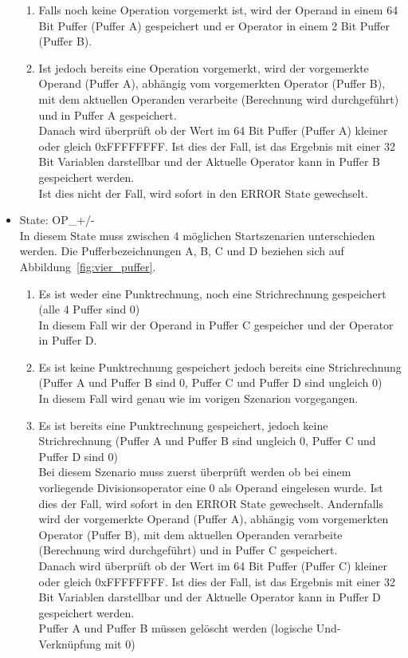 \begin{itemize}
\begin{enumerate}

\item Falls noch keine Operation vorgemerkt ist, wird der Operand in einem 64 Bit Puffer (Puffer A) gespeichert und er Operator in einem 2 Bit Puffer (Puffer B). \\

\item Ist jedoch bereits eine Operation vorgemerkt, wird der vorgemerkte Operand (Puffer A), abhängig vom vorgemerkten Operator (Puffer B), mit dem aktuellen Operanden verarbeite (Berechnung wird durchgeführt) und in Puffer A gespeichert. \\
Danach wird überprüft ob der Wert im 64 Bit Puffer (Puffer A) kleiner oder gleich 0xFFFFFFFF. Ist dies der Fall, ist das Ergebnis mit einer 32 Bit Variablen darstellbar und der Aktuelle Operator kann in Puffer B gespeichert werden. \\
Ist dies nicht der Fall, wird sofort in den ERROR State gewechselt. 

\end{enumerate}

\item State: OP\_+/- \\
In diesem State muss zwischen 4 möglichen Startszenarien unterschieden werden.
Die Pufferbezeichnungen A, B, C und D beziehen sich auf Abbildung~\ref{fig:vier_puffer}.

\begin{enumerate}

\item Es ist weder eine Punktrechnung, noch eine Strichrechnung gespeichert (alle 4 Puffer sind 0)\\
In diesem Fall wir der Operand in Puffer C gespeicher und der Operator in Puffer D.

\item Es ist keine Punktrechnung gespeichert jedoch bereits eine Strichrechnung (Puffer A und Puffer B sind 0, Puffer C und Puffer D sind ungleich 0) \\
In diesem Fall wird genau wie im vorigen Szenarion vorgegangen.

\item Es ist bereits eine Punktrechnung gespeichert, jedoch keine Strichrechnung (Puffer A und Puffer B sind ungleich 0, Puffer C und Puffer D sind 0)\\
Bei diesem Szenario muss zuerst überprüft werden ob bei einem vorliegende Divisionsoperator eine 0 als Operand eingelesen wurde. Ist dies der Fall, wird sofort in den ERROR State gewechselt. Andernfalls wird der vorgemerkte Operand (Puffer A), abhängig vom vorgemerkten Operator (Puffer B), mit dem aktuellen Operanden verarbeite (Berechnung wird durchgeführt) und in Puffer C gespeichert. \\
Danach wird überprüft ob der Wert im 64 Bit Puffer (Puffer C) kleiner oder gleich 0xFFFFFFFF. Ist dies der Fall, ist das Ergebnis mit einer 32 Bit Variablen darstellbar und der Aktuelle Operator kann in Puffer D gespeichert werden. \\
Puffer A und Puffer B müssen gelöscht werden (logische Und- Verknüpfung mit 0)


\end{enumerate}
\end{itemize}
